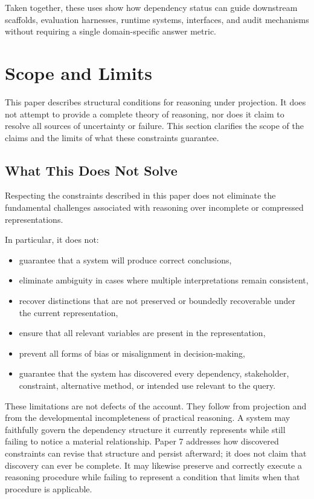 \documentclass[11pt]{article}
\begin{document}
Taken together, these uses show how dependency status can guide downstream scaffolds, evaluation harnesses, runtime systems, interfaces, and audit mechanisms without requiring a single domain-specific answer metric.

\section{Scope and Limits}

This paper describes structural conditions for reasoning under projection. It does not attempt to provide a complete theory of reasoning, nor does it claim to resolve all sources of uncertainty or failure. This section clarifies the scope of the claims and the limits of what these constraints guarantee.

\subsection{What This Does Not Solve}

Respecting the constraints described in this paper does not eliminate the fundamental challenges associated with reasoning over incomplete or compressed representations.

In particular, it does not:

\begin{itemize}[leftmargin=1.5em]
    \item guarantee that a system will produce correct conclusions,
    \item eliminate ambiguity in cases where multiple interpretations remain consistent,
    \item recover distinctions that are not preserved or boundedly recoverable under the current representation,
    \item ensure that all relevant variables are present in the representation,
    \item prevent all forms of bias or misalignment in decision-making,
    \item guarantee that the system has discovered every dependency, stakeholder, constraint, alternative method, or intended use relevant to the query.
\end{itemize}

These limitations are not defects of the account. They follow from projection and from the developmental incompleteness of practical reasoning. A system may faithfully govern the dependency structure it currently represents while still failing to notice a material relationship. Paper 7 addresses how discovered constraints can revise that structure and persist afterward; it does not claim that discovery can ever be complete. It may likewise preserve and correctly execute a reasoning procedure while failing to represent a condition that limits when that procedure is applicable.
\end{document}
